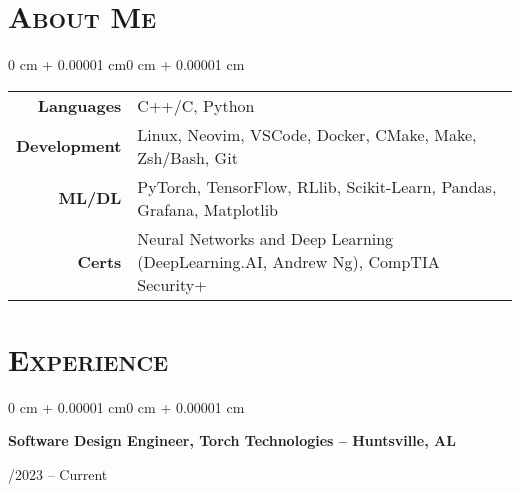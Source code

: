 \documentclass[10pt, letterpaper]{article}
\newenvironment{onecolentry}{
    \begin{adjustwidth}{0 cm + 0.00001 cm}{0 cm + 0.00001 cm}
}{
    \end{adjustwidth}
}
\newenvironment{twocolentry}[1]{
    \onecolentry
    \def\secondColumn{#1}
    \setcolumnwidth{\fill,4.5cm}
    \begin{paracol}{2}
}{
    \switchcolumn \raggedleft \secondColumn
    \end{paracol}
    \endonecolentry
}
\begin{document}
\section{\scshape About Me}

\vspace{0.2 cm}

\begin{onecolentry}
\begin{tabular}{@{}r l@{}}
\textbf{Languages} & C++/C, Python \\
\textbf{Development} & Linux, Neovim, VSCode, Docker, CMake, Make, Zsh/Bash, Git \\
\textbf{ML/DL} & PyTorch, TensorFlow, RLlib, Scikit-Learn, Pandas, Grafana, Matplotlib \\
\textbf{Certs} & Neural Networks and Deep Learning (DeepLearning.AI, Andrew Ng), CompTIA Security+ \\
\end{tabular}
\end{onecolentry}


\section{\scshape Experience}

\vspace{0.2 cm}

\begin{twocolentry}{05/2023 – Current}
    \textbf{Software Design Engineer, Torch Technologies – Huntsville, AL}
\end{twocolentry}
\end{document}
